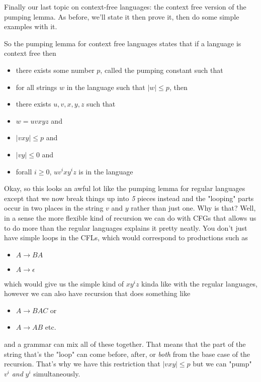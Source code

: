 \documentclass[11pt]{article}
\begin{document}
Finally our last topic on context-free languages: the context free version of the pumping lemma. As before, we'll state it then prove it, then do some simple examples with it.

So the pumping lemma for context free languages states that if a language is context free then
\begin{itemize}
\item there exists some number $p$, called the pumping constant such that
\item for all strings $w$ in the language such that $|w| \le p$, then
\item there exists $u,v,x,y,z$ such that
\item $w = uvxyz$ and
\item $|vxy| \le p$ and
\item $|vy| \le 0$ and
\item forall $i \ge 0$, $uv^ixy^iz$ is in the language
\end{itemize}

Okay, so this looks an awful lot like the pumping lemma for regular languages except that we now break things up into \emph{5} pieces instead and the "looping" parts occur in two places in the string $v$ and $y$ rather than just one. Why is that? Well, in a sense the more flexible kind of recursion we can do with CFGs that allows us to do more than the regular languages explains it pretty neatly. You don't just have simple loops in the CFLs, which would correspond to productions such as 

\begin{itemize}
\item $A \to BA$
\item $A \to \epsilon$
\end{itemize}
which would give us the simple kind of $xy^iz$ kinda like with the regular languages, however we can also have recursion that does something like

\begin{itemize}
\item $A \to BAC$ or
\item $A \to AB$ etc.
\end{itemize}

and a grammar can mix all of these together. That means that the part of the string that's the "loop" can come before, after, or \emph{both} from the base case of the recursion. That's why we have this restriction that $|vxy| \le p$ but we can "pump" $v^i$ \emph{and} $y^i$ simultaneously. 
\end{document}
